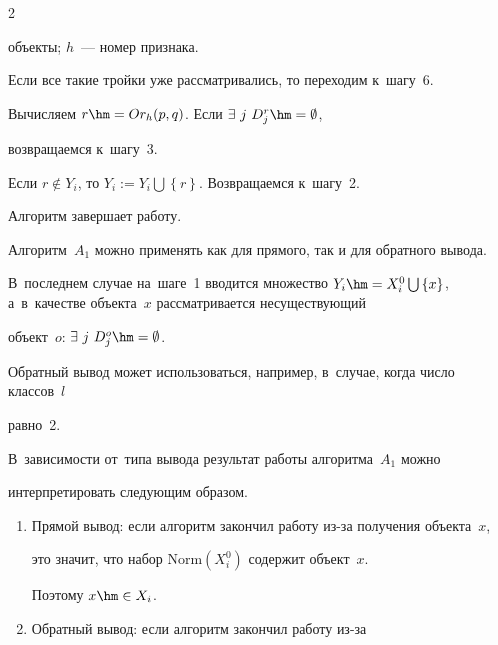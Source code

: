 \begin{multicols}{2}
\begin{description}
объекты; $h$~--- номер признака.


Если все такие тройки уже рассматривались, то переходим к~шагу~6.





\item[Шаг~4.] Вычисляем $r\hm=Or_{h}(p,q) $. Если $\exists\ j \ D_{j}^{r}\hm=\emptyset$, 


возвращаемся к~шагу~3.





\item[Шаг~5.] Если $r \notin Y_{i} $, то $ Y_{i} := Y_{i} \bigcup \left\lbrace r 


\right\rbrace$. Возвращаемся к~шагу~2.





\item[Шаг~6.] Алгоритм завершает работу.


\end{description}





Алгоритм~$ A_{1} $ можно применять как для прямого, так и для обратного вывода.


В~последнем случае на~шаге~1 вводится множество $ Y_{i}\hm=X_{i}^{0} \bigcup 


\left\lbrace x \right\rbrace$, а~в~качестве объекта~$x$ рассматривается несуществующий 


объект~$o$: $\exists\ j \ D_{j}^{o}\hm=\emptyset$.


Обратный вывод может использоваться, например, в~случае, когда число классов~$l$ 


рав\-но~2.


В~зависимости от~типа вывода результат работы алгоритма~$A_{1}$ можно 


интерпретировать следующим образом.


\begin{enumerate}[1.]


\item Прямой вывод: если алгоритм закончил работу из-за получения объекта~$x$, 


это значит, что набор $\mathrm{Norm}(X_{i}^{0})$ содержит объект~$x$.


Поэтому  $x \hm\in X_{i}$.





\item Обратный вывод: если алгоритм закончил работу из-за 



\end{enumerate}
\end{multicols}
